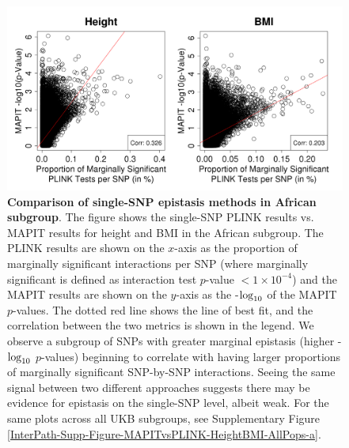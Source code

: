 \documentclass[12pt,a4paper]{article}
\def\log{{\rm log}}
\begin{document}
\begin{figure}[htb]
\centering
\includegraphics[scale=.45]{Images/Main/InterPath_Main_Figure_PLINKvsMAPIT_vs3_African_HeightBMI.png}
\caption[TBD]{\textbf{Comparison of single-SNP epistasis methods in African subgroup}. The figure shows the single-SNP PLINK results vs. MAPIT results for height and BMI in the African subgroup. The PLINK results are shown on the $x$-axis as the proportion of marginally significant interactions per SNP (where marginally significant is defined as interaction test $p$-value $< 1\times10^{-4}$) and the MAPIT results are shown on the $y$-axis as the -$\log_{10}$ of the MAPIT $p$-values. The dotted red line shows the line of best fit, and the correlation between the two metrics is shown in the legend. We observe a subgroup of SNPs with greater marginal epistasis (higher -$\log_{10}$ $p$-values) beginning to correlate with having larger proportions of marginally significant SNP-by-SNP interactions. Seeing the same signal between two different approaches suggests there may be evidence for epistasis on the single-SNP level, albeit weak. For the same plots across all UKB subgroups, see Supplementary Figure \ref{InterPath-Supp-Figure-MAPITvsPLINK-HeightBMI-AllPops-a}.}
\label{InterPath-Main-Figure-PLINKvsMAPIT-HeightBMI-African}
\end{figure}
\end{document}
